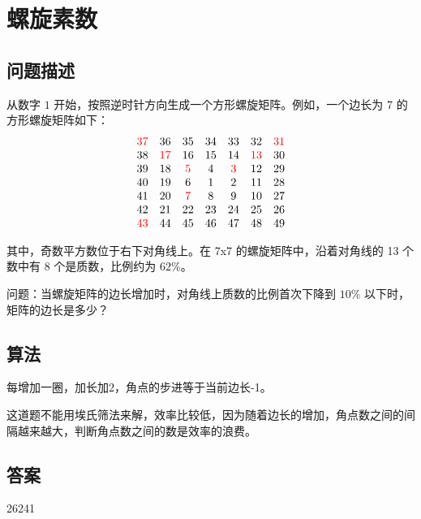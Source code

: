 \section{螺旋素数}\label{sec:problem58}
\subsection{问题描述}
\begin{tcolorbox}
	从数字 $1$ 开始，按照逆时针方向生成一个方形螺旋矩阵。例如，一个边长为 7 的方形螺旋矩阵如下：
	\[
		\begin{matrix}
			\textcolor{red}{37} & 36       & 35      & 34 & 33      & 32       & \textcolor{red}{31} \\
			38       & \textcolor{red}{17} & 16      & 15 & 14      & \textcolor{red}{13} & 30       \\
			39       & 18       & \textcolor{red}{5} & 4  & \textcolor{red}{3} & 12       & 29       \\
			40       & 19       & 6       & 1  & 2       & 11       & 28       \\
			41       & 20       & \textcolor{red}{7} & 8  & 9       & 10       & 27       \\
			42       & 21       & 22      & 23 & 24      & 25       & 26       \\
			\textcolor{red}{43} & 44       & 45      & 46 & 47      & 48       & 49       \\
		\end{matrix}
	\]

	其中，奇数平方数位于右下对角线上。在 7x7 的螺旋矩阵中，沿着对角线的 13 个数中有 8 个是质数，比例约为 $62\%$。

	问题：当螺旋矩阵的边长增加时，对角线上质数的比例首次下降到 $10\%$ 以下时，矩阵的边长是多少？
\end{tcolorbox}

\subsection{算法}
每增加一圈，加长加2，角点的步进等于当前边长-1。

这道题不能用埃氏筛法来解，效率比较低，因为随着边长的增加，角点数之间的间隔越来越大，判断角点数之间的数是效率的浪费。

\subsection{答案}
26241
